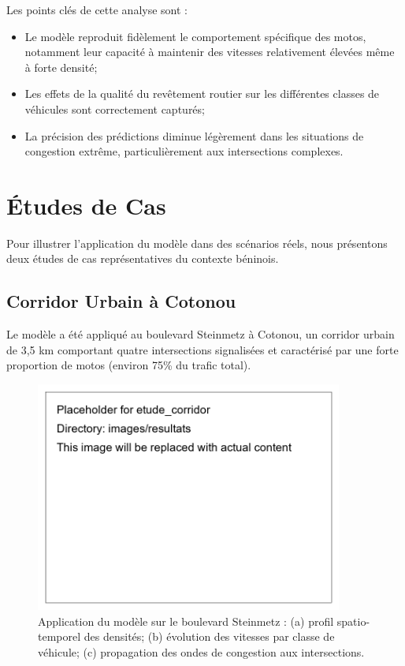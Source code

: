 Les points clés de cette analyse sont :
\begin{itemize}
\item Le modèle reproduit fidèlement le comportement spécifique des motos, notamment leur capacité à maintenir des vitesses relativement élevées même à forte densité;
\item Les effets de la qualité du revêtement routier sur les différentes classes de véhicules sont correctement capturés;
\item La précision des prédictions diminue légèrement dans les situations de congestion extrême, particulièrement aux intersections complexes.
\end{itemize}

\section{Études de Cas}
\label{sec:etudes_cas}

Pour illustrer l'application du modèle dans des scénarios réels, nous présentons deux études de cas représentatives du contexte béninois.

\subsection{Corridor Urbain à Cotonou}
\label{subsec:corridor_urbain}

Le modèle a été appliqué au boulevard Steinmetz à Cotonou, un corridor urbain de 3,5 km comportant quatre intersections signalisées et caractérisé par une forte proportion de motos (environ 75\% du trafic total).

\begin{figure}[htbp]
\centering
\includegraphics[width=0.9\textwidth]{images/resultats/etude_corridor}
\caption{Application du modèle sur le boulevard Steinmetz : (a) profil spatio-temporel des densités; (b) évolution des vitesses par classe de véhicule; (c) propagation des ondes de congestion aux intersections.}
\label{fig:etude_corridor}
\end{figure}

